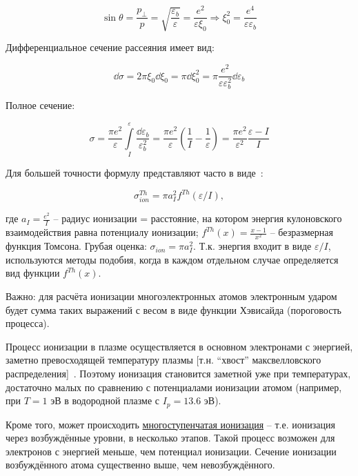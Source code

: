 \documentclass[10pt, a4paper]{article}
\begin{document}
\begin{equation*}
	\sin\theta = \frac{p_\perp}{p} = \sqrt{\frac{\varepsilon_b}{\varepsilon}} = 
	\frac{e^2}{\varepsilon\xi_0}\Rightarrow 
	\xi_0^2 = \frac{e^4}{\varepsilon \varepsilon_b}
\end{equation*}

Дифференциальное сечение рассеяния имеет вид:

\begin{equation*}
	\dd\sigma = 2\pi\xi_0\dd\xi_0 = \pi \dd\xi_0^2 = \pi\frac{e^2}{\varepsilon\varepsilon_b^2}\dd\varepsilon_b
\end{equation*}

Полное сечение:

\begin{equation}
	\sigma = \frac{\pi e^2}{\varepsilon}\int\limits_{I}^\varepsilon\frac{\dd \varepsilon_b}{\varepsilon_b^2} = \frac{\pi e^2}{\varepsilon}\left( \frac{1}{I} - \frac{1}{\varepsilon} \right) = \frac{\pi e^2}{\varepsilon^2}\frac{\varepsilon - I}{I}
\end{equation}

Для большей точности формулу представляют часто в виде~\cite{astap}:

\begin{equation*}
	\sigma_{ion}^{Th} = \pi a_I^2 f^{Th}(\varepsilon/I),
\end{equation*}

где $a_I = \frac{e^2}{I}$ -- радиус ионизации = расстояние, на котором энергия кулоновского взаимодействия равна потенциалу ионизации; $f^{Th}(x) = \frac{x-1}{x^2}$ -- безразмерная функция Томсона. Грубая оценка: $\sigma_{ion} = \pi a_I^2$. Т.к. энергия входит в виде $\varepsilon/I$, используются методы подобия, когда в каждом отдельном случае определяется вид функции $f^{Th}(x)$. 

Важно: для расчёта ионизации многоэлектронных атомов электронным ударом будет сумма таких выражений с весом в виде функции Хэвисайда (пороговость процесса).

Процесс ионизации в плазме осуществляется в основном электронами с энергией, заметно превосходящей температуру плазмы [т.н. ``хвост'' максвелловского распределения]~\cite{astap}. Поэтому ионизация становится заметной уже при температурах, достаточно малых по сравнению с потенциалами ионизации атомом (например, при $T=1$ эВ в водородной плазме с $I_p=13.6$ эВ).

Кроме того, может происходить \uline{многоступенчатая ионизация} -- т.е. ионизация через возбуждённые уровни, в несколько этапов. Такой процесс возможен для электронов с энергией меньше, чем потенциал ионизации. Сечение ионизации возбуждённого атома существенно выше, чем невозбуждённого. 
\end{document}

